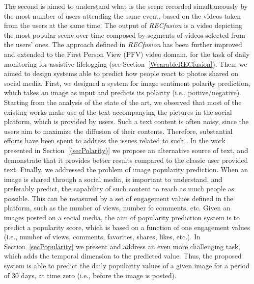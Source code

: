 The second is aimed to understand what is the scene recorded simultaneously by the most number of users attending the same event, based on the videos taken from the users at the same time. The output of \textit{RECfusion} is a video depicting the most popular scene over time composed by segments of videos selected from the users' ones.
The approach defined in \textit{RECfusion} has been further improved and extended to the First Person View (PFV) video domain, for the task of daily monitoring for assistive lifelogging (see Section~\ref{WearableRECfusion}).
Then, we aimed to design systems able to predict how people react to photos shared on social media. First, we designed a system for image sentiment polarity prediction, which takes an image as input and predicts its polarity (i.e., poitive/negative). Starting from the analysis of the state of the art, we observed that most of the existing works make use of the text accompanying the pictures in the social platform, which is provided by users. Such a text content is often noisy, since the users aim to maximize the diffusion of their contents. Therefore, substantial efforts have been spent to address the issues related to such . In the work presented in Section~\ref{(secPolarity)} we propose an alternative source of text, and demonstrate that it provides better results compared to the classic user provided text. 
Finally, we addressed the problem of image popularity prediction. When an image is shared through a social media, is important to understand, and preferably predict, the capability of such content to reach as much people as possible. This can be measured by a set of engagement values defined in the platform, such as the number of views, number fo comments, etc. Given an images posted on a social media, the aim of popularity prediction system is to predict a popularity score, which is based on a function of one engagement values (i.e., number of views, comments, favorites, shares, likes, etc.).
In Section~\ref{secPopularity} we present and address an even more challenging task, which adds the temporal dimension to the predicted value. Thus, the proposed system is able to predict the daily popularity values of a given image for a period of 30 days, at time zero (i.e., before the image is posted).


